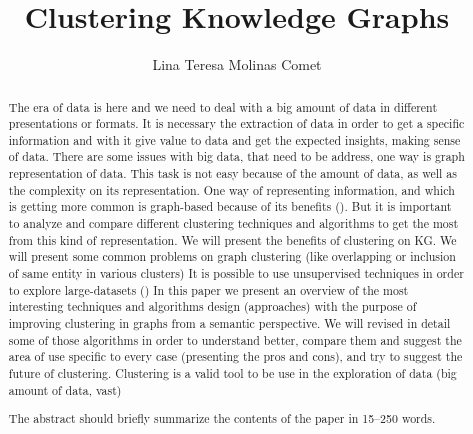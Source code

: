 \documentclass[runningheads]{llncs}
\begin{document}
%
\title{Clustering Knowledge Graphs}
%
%
\author{Lina Teresa Molinas Comet}
%
%
%
\maketitle              %
%
\begin{abstract}
The era of data is here and we need to deal with a big amount of data in different presentations or formats. It is necessary the extraction of data in order to get a specific information and with it give value to data and get the expected insights, making sense of data. There are some issues with big data, that need to be address, one way is graph representation of data. This task is not easy because of the amount of data, as well as the complexity on its representation. One way of representing information, and which is getting more common is graph-based because of its benefits (). But it is important to analyze and compare different clustering techniques and algorithms to get the most from this kind of representation. We will present the benefits of clustering on KG. We will present some common problems on graph clustering (like overlapping or inclusion of same entity in various clusters)
It is possible to use unsupervised techniques in order to explore large-datasets ()
In this paper we present an overview of the most interesting techniques and algorithms design (approaches) with the purpose of improving clustering in graphs from a semantic perspective. We will revised in detail some of those algorithms in order to understand better, compare them and suggest the area of use specific to every case (presenting the pros and cons), and try to suggest the future of clustering.
Clustering is a valid tool to be use in the exploration of data (big amount of data, vast)

The abstract should briefly summarize the contents of the paper in
15--250 words.

\end{abstract}
%
%
%
\end{document}
